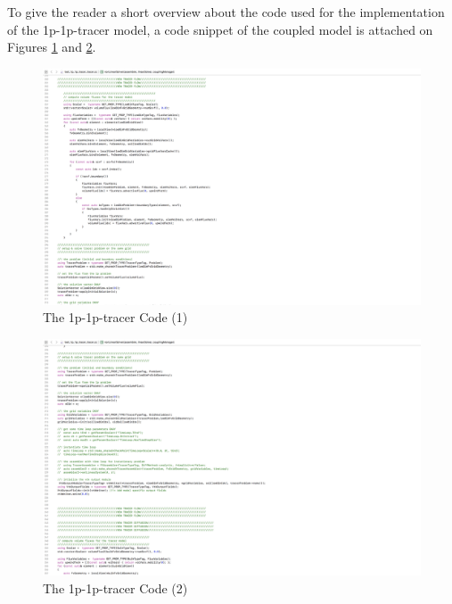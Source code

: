To give the reader a short overview about the code used for the implementation of the 1p-1p-tracer model, a code snippet of the coupled model is attached on Figures \ref{fig:1p-1p-tracer-tracer-1} and \ref{fig:1p-1p-tracer-tracer-2}. %
\begin{figure}[h]
\centering
\includegraphics[width=350mm]{1p_1p_tracer_tracer_1}
\caption{\footnotesize The 1p-1p-tracer Code (1)}
\label{fig:1p-1p-tracer-tracer-1}
\end{figure}
\begin{figure}[h]
\centering
\includegraphics[width=350mm]{1p_1p_tracer_tracer_2}
\caption{\footnotesize The 1p-1p-tracer Code (2)}
\label{fig:1p-1p-tracer-tracer-2}
\end{figure}

